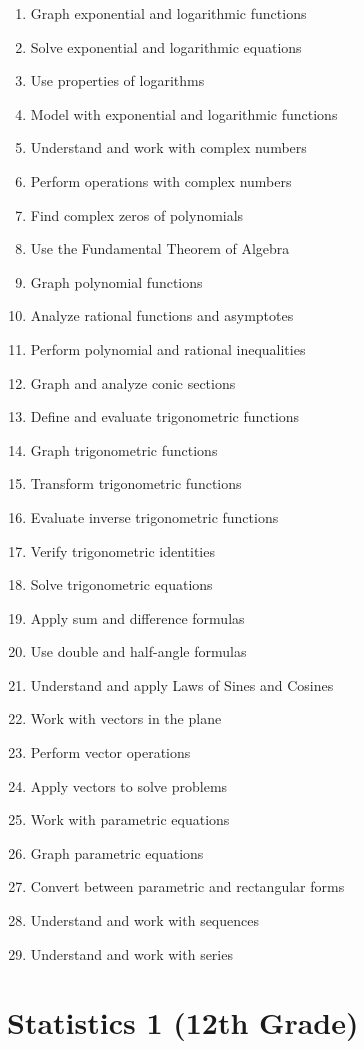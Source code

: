 \documentclass[11pt]{article}
\begin{document}
\begin{enumerate}
\item Graph exponential and logarithmic functions
\item Solve exponential and logarithmic equations
\item Use properties of logarithms
\item Model with exponential and logarithmic functions
\item Understand and work with complex numbers
\item Perform operations with complex numbers
\item Find complex zeros of polynomials
\item Use the Fundamental Theorem of Algebra
\item Graph polynomial functions
\item Analyze rational functions and asymptotes
\item Perform polynomial and rational inequalities
\item Graph and analyze conic sections
\item Define and evaluate trigonometric functions
\item Graph trigonometric functions
\item Transform trigonometric functions
\item Evaluate inverse trigonometric functions
\item Verify trigonometric identities
\item Solve trigonometric equations
\item Apply sum and difference formulas
\item Use double and half-angle formulas
\item Understand and apply Laws of Sines and Cosines
\item Work with vectors in the plane
\item Perform vector operations
\item Apply vectors to solve problems
\item Work with parametric equations
\item Graph parametric equations
\item Convert between parametric and rectangular forms
\item Understand and work with sequences
\item Understand and work with series
\end{enumerate}

\section{Statistics 1 (12th Grade)}
\end{document}
